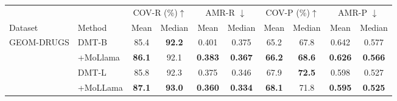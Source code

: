 \begin{tabular}{llcccccccc}\toprule
    &          & \multicolumn{2}{c}{COV-R (\%)$\uparrow$} & \multicolumn{2}{c}{AMR-R $\downarrow$} & \multicolumn{2}{c}{COV-P (\%)$\uparrow$} & \multicolumn{2}{c}{AMR-P $\downarrow$} \\ \cmidrule(lr){3-4} \cmidrule(lr){5-6}  \cmidrule(lr){7-8} \cmidrule(lr){9-10}
Dataset                     & Method   & Mean               & Median             & Mean              & Median           & Mean               & Median             & Mean              & Median           \\ \midrule
\multirow{4}{1.5cm}{GEOM-DRUGS} & DMT-B    & 85.4               & \textbf{92.2}      & 0.401             & 0.375            & 65.2               & 67.8               & 0.642             & 0.577            \\
    & +MoLlama & \textbf{86.1}      & 92.1               & \textbf{0.383}    & \textbf{0.367}   & \textbf{66.2}      & \textbf{68.6}      & \textbf{0.626}    & \textbf{0.566}   \\\cmidrule(lr){2-10}
    \multicolumn{1}{c}{}                            & DMT-L    & 85.8                 & 92.3                 & 0.375             & 0.346            & 67.9                 & \textbf{72.5}        & 0.598             & 0.527            \\
\multicolumn{1}{c}{}                            & +MoLLama & \textbf{87.1}        & \textbf{93.0}        & \textbf{0.360}    & \textbf{0.334}   & \textbf{68.1}        & 71.8                 & \textbf{0.595}    & \textbf{0.525}   \\\bottomrule
\end{tabular}